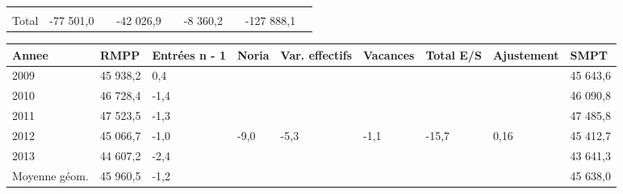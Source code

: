 \begin{longtable}[]{@{}lllllllll@{}}
\begin{minipage}[t]{0.06\columnwidth}
\strut
\end{minipage} & \begin{minipage}[t]{0.12\columnwidth}\raggedright
\strut
\end{minipage} & \begin{minipage}[t]{0.06\columnwidth}\raggedright
\strut
\end{minipage} & \begin{minipage}[t]{0.09\columnwidth}\raggedright
\strut
\end{minipage} & \begin{minipage}[t]{0.06\columnwidth}\raggedright
\strut
\end{minipage}\tabularnewline
\begin{minipage}[t]{0.05\columnwidth}\raggedright
Total\strut
\end{minipage} & \begin{minipage}[t]{0.10\columnwidth}\raggedright
-77 501,0\strut
\end{minipage} & \begin{minipage}[t]{0.06\columnwidth}\raggedright
\strut
\end{minipage} & \begin{minipage}[t]{0.16\columnwidth}\raggedright
-42 026,9\strut
\end{minipage} & \begin{minipage}[t]{0.06\columnwidth}\raggedright
\strut
\end{minipage} & \begin{minipage}[t]{0.12\columnwidth}\raggedright
-8 360,2\strut
\end{minipage} & \begin{minipage}[t]{0.06\columnwidth}\raggedright
\strut
\end{minipage} & \begin{minipage}[t]{0.09\columnwidth}\raggedright
-127 888,1\strut
\end{minipage} & \begin{minipage}[t]{0.06\columnwidth}\raggedright
\strut
\end{minipage}\tabularnewline
\bottomrule
\end{longtable}

\begin{longtable}[]{@{}lllllllll@{}}
\toprule
Annee & RMPP & Entrées n - 1 & Noria & Var. effectifs & Vacances & Total
E/S & Ajustement & SMPT\tabularnewline
\midrule
\endhead
2009 & 45 938,2 & 0,4 & & & & & & 45 643,6\tabularnewline
2010 & 46 728,4 & -1,4 & & & & & & 46 090,8\tabularnewline
2011 & 47 523,5 & -1,3 & & & & & & 47 485,8\tabularnewline
2012 & 45 066,7 & -1,0 & -9,0 & -5,3 & -1,1 & -15,7 & 0,16 & 45
412,7\tabularnewline
2013 & 44 607,2 & -2,4 & & & & & & 43 641,3\tabularnewline
Moyenne géom. & 45 960,5 & -1,2 & & & & & & 45 638,0\tabularnewline
\bottomrule
\end{longtable}

